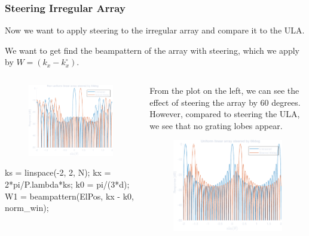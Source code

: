 \documentclass[compress]{beamer}
\newcommand\pin{%
\parbox[t]{10pt}{\raisebox{0.2pt}{\usebeamercolor[fg]{mybullet}{$\ast$}}}}
\begin{document}
\begin{frame}[fragile] %
    \frametitle{Steering Irregular Array}
    Now we want to apply steering to the irregular array and compare it to the
    ULA.
    
    We want to get find the beampattern of the array with steering, which we apply
    by $W = \left(k_x - k_x^\circ\right)$.
    \begin{columns}
        \begin{column}{0.5\textwidth}
            \begin{figure}
                \includegraphics[width=0.8\columnwidth]{"../7a.pdf"}
            \end{figure}
            \begin{jllisting}[gobble=16,language=Matlab]
                ks = linspace(-2, 2, N);
                kx = 2*pi/P.lambda*ks; k0 = pi/(3*d);
                W1 = beampattern(ElPos, kx - k0, norm_win);
            \end{jllisting} 
        \end{column}
        \begin{column}{0.5\textwidth}
            \pin From the plot on the left, we can see the effect of steering
            the array by 60 degrees. However, compared to steering the ULA, we
            see that no grating lobes appear.
            \begin{figure}
                \includegraphics[width=0.7\columnwidth]{"../7b.pdf"}
            \end{figure}
        \end{column}
    \end{columns}
\end{frame} 
\end{document}
